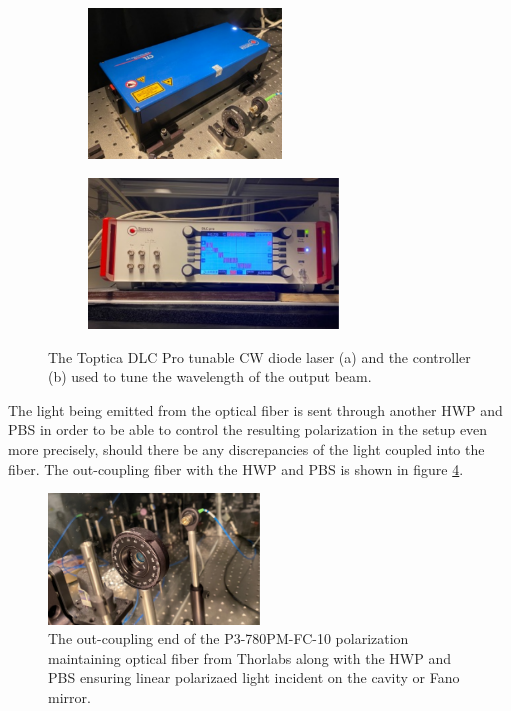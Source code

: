 \begin{figure}[h!]
    \begin{subfigure}[b]{0.49\textwidth}
        \centering
        \includegraphics[height=4cm]{figures/toptica_laser.pdf}
        \caption{}
        \label{fig:toptica_laser}
    \end{subfigure}
    \begin{subfigure}[b]{0.49\textwidth}
        \centering
        \includegraphics[height=4cm]{figures/toptica_controller.pdf}
        \caption{}
        \label{fig:toptica_controller}
    \end{subfigure}
    \caption{The Toptica DLC Pro tunable CW diode laser (a) and the controller (b) used to tune the wavelength of the output beam.}
    \label{fig:toptica_laser_and_controller}
\end{figure}

The light being emitted from the optical fiber is sent through another HWP and PBS in order to be able to control the resulting polarization in the setup even more precisely, should there be any discrepancies of the light coupled into the fiber. The out-coupling fiber with the HWP and PBS is shown in figure \ref{fig:outcoupling_fiber}.

\begin{figure}[h!]
    \centering
    \includegraphics[width=0.5\textwidth]{figures/outcoupling_fiber.pdf}
    \caption{The out-coupling end of the P3-780PM-FC-10 polarization maintaining optical fiber from Thorlabs along with the HWP and PBS ensuring linear polarizaed light incident on the cavity or Fano mirror.}
    \label{fig:outcoupling_fiber}
\end{figure}

